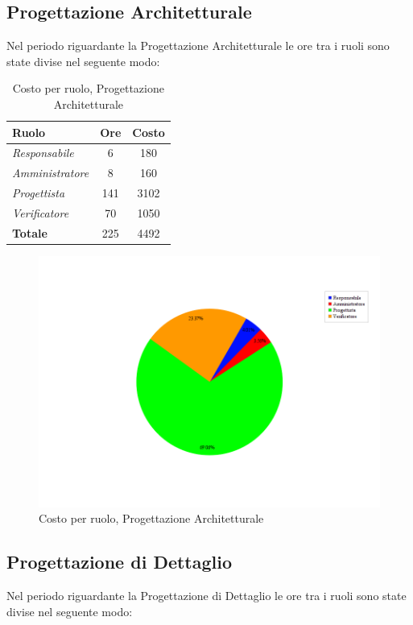 \subsection{Progettazione Architetturale}
Nel periodo riguardante la Progettazione Architetturale le ore tra i ruoli sono state divise nel seguente modo:

\begin{table}[H]
	\begin{center}
		\begin{tabular}{|l|c|c|}
			\hline
			\textbf{Ruolo}	& \textbf{Ore} &	\textbf{Costo}	 \\
			\hline
			\textit{Responsabile}	&	6	&	180		\\
			\hline
			\textit{Amministratore}	&	8	&	160		\\
			\hline
			\textit{Progettista}		&	141	&	3102	\\
			\hline
			\textit{Verificatore}	&	70	&	1050	\\
			\hline
			\textbf{Totale}	&	225	&	4492	\\
			\hline
		\end{tabular}
	\end{center}
	\caption{Costo per ruolo, Progettazione Architetturale}
\end{table}

\begin{figure}[H]
	\centering
	\includegraphics[scale=0.4]{immagini/Grafi/CostoPA}
	\caption{Costo per ruolo, Progettazione Architetturale}
\end{figure}

\subsection{Progettazione di Dettaglio}
Nel periodo riguardante la Progettazione di Dettaglio le ore tra i ruoli sono state divise nel seguente modo:

